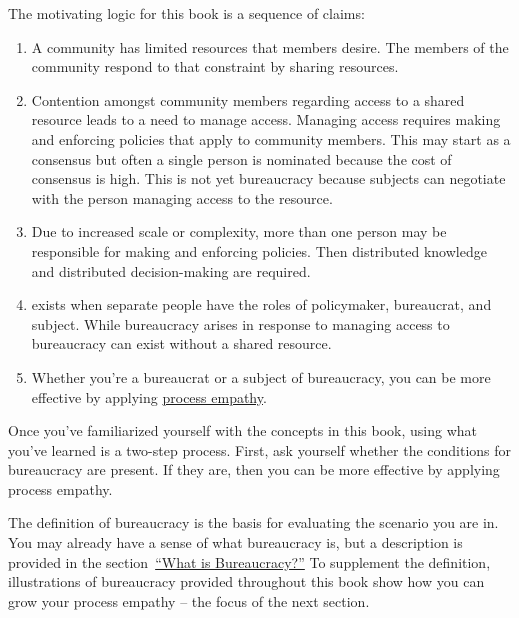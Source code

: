 The motivating logic for this book is a sequence of claims:
\begin{enumerate}
    \item A community has limited resources that members desire. The members of the community respond to that constraint by sharing resources.
    \item Contention amongst community members regarding access to a \gls{shared resource} leads to a need to manage access.  
    \iftoggle{glossaryinmargin}{\marginpar{[Glossary]}}{}%
    Managing access requires making and enforcing policies that apply to community members. This may start as a consensus but often a single person is nominated because the cost of consensus is high. This is not yet bureaucracy because subjects can negotiate with the person managing access to the resource.
    \item Due to increased scale or complexity, more than one person may be responsible for making and enforcing policies. Then distributed knowledge and distributed decision-making are required.
    \item 
\iftoggle{glossarysubstitutionworks}{\Gls{bureaucracy}}{Bureaucracy}%
\iftoggle{glossaryinmargin}{\marginpar{[Glossary]}}{} exists when separate people have the roles of policymaker, bureaucrat, and subject. While bureaucracy arises in response to managing access to 
\iftoggle{glossarysubstitutionworks}{\glspl{shared resource},}{shared resources,} bureaucracy can exist without a shared resource.
    \item Whether you're a \gls{bureaucrat} 
    \iftoggle{glossaryinmargin}{\marginpar{[Glossary]}}{}%
    or a subject of bureaucracy, you can be more effective by applying \hyperref[sec:process-empathy]{process empathy}.
\end{enumerate}

Once you've familiarized yourself with the concepts in this book, using what you've learned is a two-step process. First, ask yourself whether the conditions for bureaucracy are present. If they are, then you can be more effective by applying process empathy.

The definition of bureaucracy is the basis for evaluating the scenario you are in. You may already have a sense of what bureaucracy is, but a description is provided %
\iftoggle{haspagenumbers}{ on page~\pageref{sec:define-bureaucracy}}{} 
in the section~\hyperref[sec:define-bureaucracy]{``What is Bureaucracy?''} To supplement the definition, illustrations of bureaucracy provided throughout this book show how you can grow your process empathy -- the focus of the next section. 